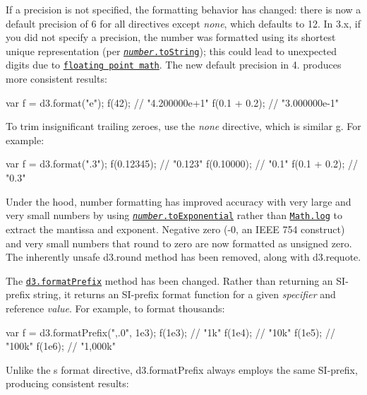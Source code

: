 If a precision is not specified, the formatting behavior has changed\+: there is now a default precision of 6 for all directives except {\itshape none}, which defaults to 12. In 3.\+x, if you did not specify a precision, the number was formatted using its shortest unique representation (per \href{https://developer.mozilla.org/en-US/docs/Web/JavaScript/Reference/Global_Objects/Number/toString}{\tt {\itshape number}.to\+String}); this could lead to unexpected digits due to \href{http://0.30000000000000004.com/}{\tt floating point math}. The new default precision in 4. produces more consistent results\+:


\begin{DoxyCode}
var f = d3.format("e");
f(42);        // "4.200000e+1"
f(0.1 + 0.2); // "3.000000e-1"
\end{DoxyCode}


To trim insignificant trailing zeroes, use the {\itshape none} directive, which is similar {\ttfamily g}. For example\+:


\begin{DoxyCode}
var f = d3.format(".3");
f(0.12345);   // "0.123"
f(0.10000);   // "0.1"
f(0.1 + 0.2); // "0.3"
\end{DoxyCode}


Under the hood, number formatting has improved accuracy with very large and very small numbers by using \href{https://developer.mozilla.org/en-US/docs/Web/JavaScript/Reference/Global_Objects/Number/toExponential}{\tt {\itshape number}.to\+Exponential} rather than \href{https://developer.mozilla.org/en-US/docs/Web/JavaScript/Reference/Global_Objects/Math/log}{\tt Math.\+log} to extract the mantissa and exponent. Negative zero (-\/0, an I\+E\+EE 754 construct) and very small numbers that round to zero are now formatted as unsigned zero. The inherently unsafe d3.\+round method has been removed, along with d3.\+requote.

The \href{https://github.com/d3/d3-format/blob/master/README.md#formatPrefix}{\tt d3.\+format\+Prefix} method has been changed. Rather than returning an S\+I-\/prefix string, it returns an S\+I-\/prefix format function for a given {\itshape specifier} and reference {\itshape value}. For example, to format thousands\+:


\begin{DoxyCode}
var f = d3.formatPrefix(",.0", 1e3);
f(1e3); // "1k"
f(1e4); // "10k"
f(1e5); // "100k"
f(1e6); // "1,000k"
\end{DoxyCode}


Unlike the {\ttfamily s} format directive, d3.\+format\+Prefix always employs the same S\+I-\/prefix, producing consistent results\+:


